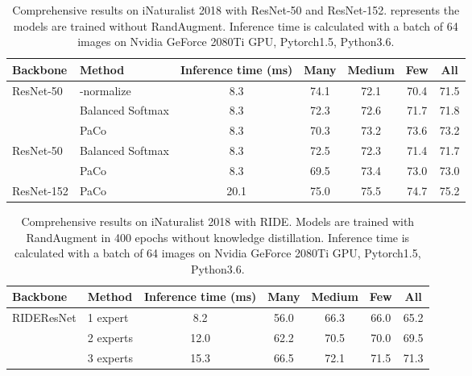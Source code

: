 \documentclass[10pt,twocolumn,letterpaper]{article}
\begin{document}
\begin{table*}[h]
	\caption{Comprehensive results on iNaturalist 2018 with ResNet-50 and ResNet-152. \dag represents the models are trained without RandAugment. Inference time is calculated with a batch of 64 images on Nvidia GeForce 2080Ti GPU, Pytorch1.5, Python3.6.}
\label{tab:inat_extra}
	\begin{center}
		\begin{tabular}{llccccc}
			\toprule
			Backbone & Method & \textbf{Inference time (ms)} & Many & Medium & Few & All\\
			\midrule
			\multirow{3}{*}{ResNet-50}
			&-normalize &8.3 &74.1 &72.1 &70.4 &71.5 \\
			&Balanced Softmax &8.3 &72.3 &72.6 &71.7 &71.8 \\
			&PaCo             &8.3 &70.3 &73.2 &73.6 &73.2 \\
			\midrule
			\multirow{2}{*}{ResNet-50 \dag}
			&Balanced Softmax &8.3 &72.5 &72.3 &71.4 &71.7 \\
			&PaCo             &8.3 &69.5 &73.4 &73.0 &73.0 \\
			\midrule
			\multirow{1}{*}{ResNet-152}         
			&PaCo &20.1 &75.0 &75.5 &74.7 &75.2  \\
			\bottomrule
		\end{tabular}
	\end{center}
\end{table*}

\newpage
\begin{table*}[t]
	\caption{Comprehensive results on iNaturalist 2018 with RIDE. Models are trained with RandAugment in 400 epochs without knowledge distillation. Inference time is calculated with a batch of 64 images on Nvidia GeForce 2080Ti GPU, Pytorch1.5, Python3.6.}
\label{tab:inat_ride}
	\begin{center}
		\begin{tabular}{llccccc}
			\toprule
			Backbone & Method & \textbf{Inference time (ms)} & Many & Medium & Few & All\\
			\midrule
			\multirow{4}{*}{RIDEResNet}
			&1 expert  &8.2  &56.0 &66.3 &66.0 &65.2 \\
			&2 experts &12.0 &62.2 &70.5 &70.0 &69.5 \\
			&3 experts &15.3 &66.5 &72.1 &71.5 &71.3 \\
			\bottomrule
		\end{tabular}
	\end{center}
\end{table*}
\end{document}
